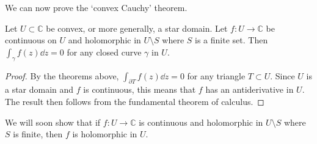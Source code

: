 We can now prove the `convex Cauchy' theorem.
\begin{corollary}
	Let \( U \subset \mathbb C \) be convex, or more generally, a star domain.
	Let \( f \colon U \to \mathbb C \) be continuous on \( U \) and holomorphic in \( U \setminus S \) where \( S \) is a finite set.
	Then \( \int_\gamma f(z) \dd{z} = 0 \) for any closed curve \( \gamma \) in \( U \).
\end{corollary}
\begin{proof}
	By the theorems above, \( \int_{\partial T} f(z) \dd{z} = 0 \) for any triangle \( T \subset U \).
	Since \( U \) is a star domain and \( f \) is continuous, this means that \( f \) has an antiderivative in \( U \).
	The result then follows from the fundamental theorem of calculus.
\end{proof}
\begin{remark}
	We will soon show that if \( f \colon U \to \mathbb C \) is continuous and holomorphic in \( U \setminus S \) where \( S \) is finite, then \( f \) is holomorphic in \( U \).
\end{remark}

